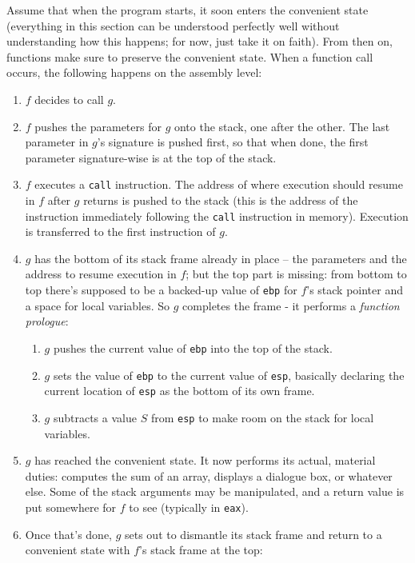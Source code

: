 \documentclass{article}
\newcommand{\xcode}[2]{\colorbox{ubuntuback}{\lstinline[language=#1]|#2|}}
\newcommand{\asm}[1]{\xcode{{[x86masm]assembler}}{#1}}
\begin{document}
Assume that when the program starts, it soon enters the convenient state (everything in this section can be understood perfectly well without understanding how this happens; for now, just take it on faith). From then on, functions make sure to preserve the convenient state. When a function call occurs, the following happens on the assembly level:

\begin{enumerate}
    \item $f$ decides to call $g$. 
    \item $f$ pushes the parameters for $g$ onto the stack, one after the other. The last parameter in $g$'s signature is pushed first, so that when done, the first parameter signature-wise is at the top of the stack.
    \item $f$ executes a \asm{call} instruction. The address of where execution should resume in $f$ after $g$ returns is pushed to the stack (this is the address of the instruction immediately following the \asm{call} instruction in memory). Execution is transferred to the first instruction of $g$.
    \item $g$ has the bottom of its stack frame already in place -- the parameters and the address to resume execution in $f$; but the top part is missing: from bottom to top there's supposed to be a backed-up value of \asm{ebp} for $f$'s stack pointer and a space for local variables. So $g$ completes the frame - it performs a \textit{function prologue}:
        \begin{enumerate} 
            \item $g$ pushes the current value of \asm{ebp} into the top of the stack.
            \item $g$ sets the value of \asm{ebp} to the current value of \asm{esp}, basically declaring the current location of \asm{esp} as the bottom of its own frame.
            \item $g$ subtracts a value $S$ from \asm{esp} to make room on the stack for local variables. 
        \end{enumerate}
    \item $g$ has reached the convenient state. It now performs its actual, material duties: computes the sum of an array, displays a dialogue box, or whatever else. Some of the stack arguments may be manipulated, and a return value is put somewhere for $f$ to see (typically in \asm{eax}).
    \item Once that's done, $g$ sets out to dismantle its stack frame and return to a convenient state with $f$'s stack frame at the top:  

\end{enumerate}
\end{document}
